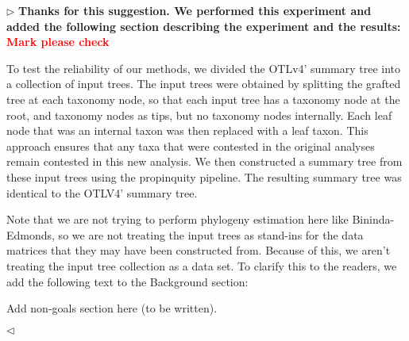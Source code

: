 \documentclass{article}
\newenvironment{reply}{$\triangleright$\bf}{$\triangleleft$}
\renewenvironment{quote}
               {\list{}{\rightmargin\leftmargin}%
                \item\relax\normalfont}
               {\endlist}
\begin{document}
\begin{reply}
Thanks for this suggestion.  We performed this experiment and added the following section describing the experiment and the results: \textcolor{red}{\textbf{Mark please check}}
\begin{quote}
To test the reliability of our methods, we divided the OTLv4' summary
tree into a collection of input trees. The input trees were obtained
by splitting the grafted tree at each taxonomy node, so that each
input tree has a taxonomy node at the root, and taxonomy nodes as
tips, but no taxonomy nodes internally.  Each leaf node that was an
internal taxon was then replaced with a leaf taxon. This approach
ensures that any taxa that were contested in the original analyses
remain contested in this new analysis.  We then constructed a summary
tree from these input trees using the propinquity pipeline.  The
resulting summary tree was identical to the OTLV4' summary tree.  
\end{quote}

Note that we are not trying to perform phylogeny estimation here like Bininda-Edmonds, so we are not treating the input trees as stand-ins for the data matrices that they may have been constructed from.  Because of this, we aren't treating the input tree collection as a data set.  To clarify this to the readers, we add the following text to the Background section:
\begin{quote}
Add non-goals section here (to be written).
\end{quote}

\end{reply}
\end{document}
